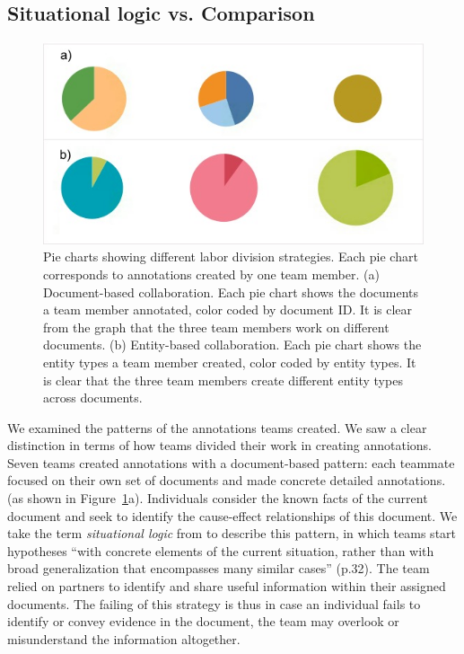 \subsection{Situational logic vs. Comparison}

\begin{figure}
	\centering
	\includegraphics[width=\columnwidth]{04-Study_one/img/labor_division.jpg}
	\caption{Pie charts showing different labor division strategies. Each
		pie chart corresponds to annotations created by one team member. (a) Document-based
		collaboration. Each pie chart shows the documents a team member
		annotated, color coded by document ID. It is clear from the graph that the three team members work on different documents. (b) Entity-based collaboration.
		Each pie chart shows the entity types a team member created, color
		coded by entity types. It is clear that the three team members create different entity types across documents.
	\label{fig:labor_division}}
\end{figure}

We examined the patterns of the annotations teams created. We saw a clear distinction in terms of how teams divided their work in creating annotations. Seven
teams created annotations with a document-based pattern: each teammate focused on their own set of documents and made concrete detailed annotations.
(as shown in Figure~\ref{fig:labor_division}a). Individuals consider the known facts of the current document and seek to identify the cause-effect relationships of this document. We take the term \textit{situational logic} from \citep{Heuer1999} to describe this pattern, in which teams start hypotheses ``with concrete elements of the current situation, rather than with broad generalization that encompasses many similar cases'' (p.32). The team relied on partners to identify and share useful information within their assigned documents. The failing of this
strategy is thus in case an individual fails to identify or convey
evidence in the document, the team may overlook or misunderstand the information
altogether.

